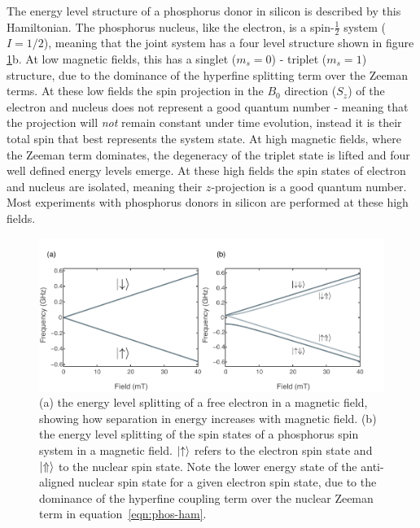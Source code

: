 The energy level structure of a phosphorus donor in silicon is described by this Hamiltonian. The phosphorus nucleus, like the electron, is a spin-$\frac{1}{2}$ system ($I = 1/2$), meaning that the joint system has a four level  structure shown in figure \ref{fig:elecSplit}b. At low magnetic fields, this has a singlet ($m_s = 0$) - triplet ($m_s = 1$) structure, due to the dominance of the hyperfine splitting term over the Zeeman terms. At these low fields the spin projection in the $B_0$ direction ($S_z$) of the electron and nucleus does not represent a good quantum number - meaning that the projection will \emph{not} remain constant under time evolution, instead it is their total spin that best represents the system state. At high magnetic fields, where the Zeeman term dominates, the degeneracy of the triplet state is lifted and four well defined energy levels emerge. At these high fields the spin states of electron and nucleus are isolated, meaning their $z$-projection is a good quantum number. Most experiments with phosphorus donors in silicon are performed at these high fields.

\begin{figure}
\centering
\includegraphics[width = \columnwidth]{Plotting/Figs/all-levels-fig.pdf}
\caption[Energy level splittings for a free electron and an electron bound to a phosphorus donor in silicon]{(a) the energy level splitting of a free electron in a magnetic field, showing how separation in energy increases with magnetic field. (b) the energy level splitting of the spin states of a phosphorus spin system in a magnetic field. $\ket{\uparrow}$ refers to the electron spin state and $\ket{\Uparrow}$ to the nuclear spin state. Note the lower energy state of the anti-aligned nuclear spin state for a given electron spin state, due to the dominance of the hyperfine coupling term over the nuclear Zeeman term in equation~\ref{eqn:phos-ham}.}
\label{fig:elecSplit}
\end{figure}

